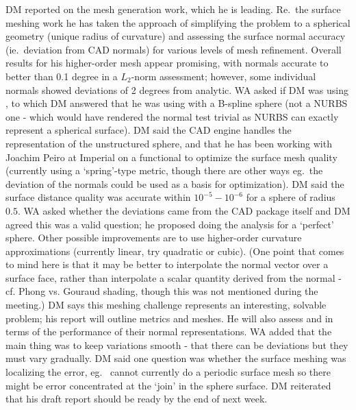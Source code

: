 DM reported on the mesh generation work, which he is leading.  Re.\ the surface 
meshing work he has taken the approach of simplifying the problem to a 
spherical geometry (unique radius of curvature) and assessing the surface 
normal accuracy (ie.\ deviation from CAD normals) for various levels of mesh 
refinement.  Overall results for his higher-order mesh appear promising, with 
normals accurate to better than 0.1 degree in a $L_2$-norm assessment; however, 
some individual normals showed deviations of 2 degrees from analytic.  WA asked 
if DM was using , to which DM answered that he was using  with a B-spline sphere (not a NURBS one - which would have 
rendered the normal test trivial as NURBS can exactly represent a spherical surface). 
DM said the CAD engine handles the 
representation of the unstructured sphere, and that he has been working with 
Joachim Peiro at Imperial on a functional to optimize the surface mesh quality 
(currently using a `spring'-type metric, though there are other ways eg.\ the 
deviation of the normals could be used as a basis for optimization).  DM said 
the surface distance quality was accurate within $10^{-5} - 10^{-6}$ for a 
sphere of radius~$0.5$.  WA asked whether the deviations came from the CAD 
package itself and DM agreed this was a valid question; he proposed doing the 
analysis for a `perfect' sphere.  Other possible improvements are to use 
higher-order curvature approximations (currently linear, try quadratic or 
cubic).  (One point that comes to mind here is that it may be better to 
interpolate the normal vector over a surface face, rather than interpolate a 
scalar quantity derived from the normal - cf. Phong vs. Gouraud shading, though 
this was not mentioned during the meeting.) DM says this meshing challenge 
represents an interesting, solvable problem; his report will outline metrics 
and meshes.  He will also assess  and  in terms of the 
performance of their normal representations.  WA added that the main thing was 
to keep variations smooth - that there can be deviations but they must vary 
gradually.  DM said one question was whether the surface meshing was localizing 
the error, eg.\  cannot currently do a periodic surface mesh so 
there might be error concentrated at the `join' in the sphere surface.  DM 
reiterated that his draft report should be ready by the end of next week.

